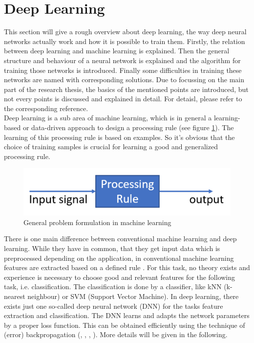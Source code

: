 \documentclass[12pt,DIV14,BCOR12mm,a4paper,footexclude,headinclude,halfparskip-,twoside,openright,openany,cleardoubleempty,idxtotoc,bibtotoc]{scrreprt} %
\numberwithin{equation}{chapter}
\begin{document}
\section{Deep Learning}
This section will give a rough overview about deep learning, the way deep neural networks actually work and how it is possible to train them. Firstly, the relation between deep learning and machine learning is explained. Then the general structure and behaviour of a neural network is explained and the algorithm for training those networks is introduced. Finally some difficulties in training these networks are named with corresponding solutions. Due to focussing on the main part of the research thesis, the basics of the mentioned points are introduced, but not every points is discussed and explained in detail. For detaisl, please refer to the corresponding reference.\\
Deep learning is a sub area of machine learning, which is in general a learning-based or data-driven approach to design a processing rule (see figure \ref{fig:ProcessingRule}). The learning of this processing rule is based on examples. So it's obvious that the choice of training samples is crucial for learning a good and generalized processing rule. 
\begin{figure}[htb!]
	\centering
	\includegraphics[width=0.5\linewidth]{Graphiken/ProcessingRule}
	\caption{General problem formulation in machine learning}
	\label{fig:ProcessingRule}
\end{figure}
There is one main difference between conventional machine learning and deep learning. While they have in common, that they get input data which is preprocessed depending on the application, in conventional machine learning features are extracted based on a defined rule \cite{Goodfellow-et-al-2016}. For this task, no theory exists and experience is necessary to choose good and relevant features for the following task, i.e. classification. The classification is done by a classifier, like kNN (k-nearest neighbour) or SVM (Support Vector Machine). In deep learning, there exists just one so-called deep neural network (DNN) for the tasks feature extraction and classification. The DNN learns and adapts the network parameters by a proper loss function. This can be obtained efficiently using the technique of (error) backpropagation (\cite{Goodfellow-et-al-2016}, \cite{Nielsen-Michael}, \cite{DeepLearningDive}, \cite{Bishop}). More details will be given in the following.\\
\end{document}
